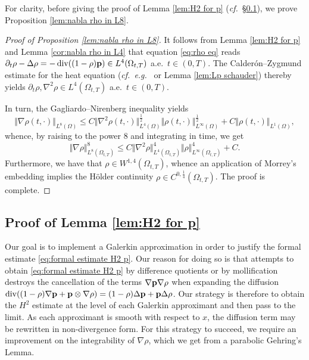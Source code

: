 \documentclass[11pt,a4paper,reqno]{amsart}
\theoremstyle{remark}
\theoremstyle{definition}
\numberwithin{equation}{section}
\DeclareMathOperator{\dv}{div}
\newcommand{\p}{{\bf p}}
\begin{document}
      For clarity, before giving the proof of Lemma \ref{lem:H2 for p} (\textit{cf.}~\S \ref{sec:proof of H2 via galerkin}), we prove Proposition \ref{lem:nabla rho in L8}. 

\begin{proof}[Proof of Proposition \ref{lem:nabla rho in L8}]
    It follows from Lemma \ref{lem:H2 for p} and Lemma \ref{cor:nabla rho in L4} that equation \eqref{eq:rho eq} reads 
   $\partial_t \rho - \Delta \rho = -\dv((1-\rho)\p) \in L^4(\Omega_{t,T})$ {a.e.~}$t\in(0,T)$. The Calder\'on--Zygmund estimate for the heat equation (\textit{cf.}~\textit{e.g.}~\cite[Theorem 3.1]{RosHeat} or Lemma \ref{lem:Lp schauder}) thereby yields $\partial_t \rho , \nabla^2 \rho \in L^4(\Omega_{t,T})$ a.e.~$t\in(0,T)$. 

   In turn, the Gagliardo--Nirenberg inequality yields 
\begin{equation}\label{eq:GN grad rho L8}
    \Vert \nabla\rho(t,\cdot) \Vert_{L^8(\Omega)} \leq C \Vert   \nabla^2\rho(t,\cdot) \Vert_{L^4(\Omega)}^{\frac{1}{2}} \Vert \rho(t,\cdot) \Vert_{L^\infty(\Omega)}^{\frac{1}{2}} + C \Vert \rho(t,\cdot) \Vert_{L^1(\Omega)}, 
\end{equation}
whence, by raising to the power $8$ and integrating in time, we get 
\begin{equation*}
    \Vert \nabla\rho \Vert_{L^8(\Omega_{t,T})}^8 \leq C \Vert   \nabla^2\rho \Vert_{L^4(\Omega_{t,T})}^{4} \Vert \rho \Vert_{L^\infty(\Omega_{t,T})}^{4} + C. 
\end{equation*}
   Furthermore, we have that $\rho \in W^{1,4}(\Omega_{t,T})$, whence an application of Morrey's embedding implies the H\"older continuity $\rho \in C^{0,\frac{1}{4}}(\Omega_{t,T})$. The proof is complete. 
\end{proof}


\subsection{Proof of Lemma \ref{lem:H2 for p}}\label{sec:proof of H2 via galerkin}



Our goal is to implement a Galerkin approximation in order to justify the formal estimate \eqref{eq:formal estimate H2 p}. Our reason for doing so is that attempts to obtain \eqref{eq:formal estimate H2 p} by difference quotients or by mollification destroys the cancellation of the terms $\nabla \p \nabla \rho$ when expanding the diffusion $\dv((1-\rho)\nabla \p + \p \otimes \nabla \rho) = (1-\rho)\Delta \p + \p \Delta \rho$. Our strategy is therefore to obtain the $H^2$ estimate at the level of each Galerkin approximant and then pass to the limit. As each approximant is smooth with respect to $x$, the diffusion term may be rewritten in non-divergence form. For this strategy to succeed, we require an improvement on the integrability of $\nabla \rho$, which we get from a parabolic Gehring's Lemma.
\end{document}
